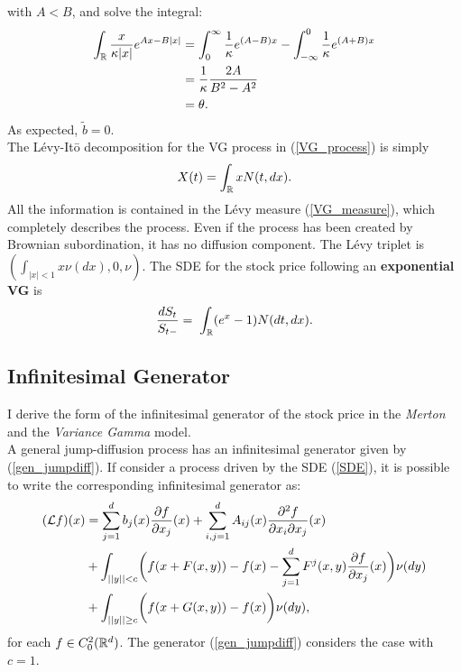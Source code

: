 with $A<B$, and solve the integral:
\begin{align*}
 \int_{\mathbb{R}} \frac{x}{\kappa |x|} e^{Ax-B|x|} &= \int_{0}^{\infty} \frac{1}{\kappa} e^{(A-B)x} 
 - \int_{-\infty}^0 \frac{1}{\kappa} e^{(A+B)x} \\
 &= \frac{1}{\kappa} \frac{2A}{B^2-A^2} \\
 &= \theta.
\end{align*}
As expected, $\tilde b = 0$. \\
The Lévy-It\={o} decomposition for the VG process in (\ref{VG_process}) is simply
\begin{equation}
X(t) = \int_{\mathbb{R}} x N(t,dx). 
\end{equation}
All the information is contained in the Lévy measure (\ref{VG_measure}),
which completely describes the process. Even if the process has been created by Brownian
subordination, it has no diffusion component.  
The L\'evy triplet is $( \int_{|x|<1} x \nu(dx), 0, \nu)$.
The SDE for the stock price following an \textbf{exponential VG} is 
\begin{equation}\label{VG_sde}
 \frac{d S_t}{S_{t-}}  = \; \int_{\mathbb{R}} (e^{x} - 1) N(dt,dx).  
\end{equation}


\subsection{Infinitesimal Generator}

I derive the form of the infinitesimal generator of the stock price in the \emph{Merton} and the \emph{Variance Gamma} model.\\
A general jump-diffusion process has an infinitesimal generator given by (\ref{gen_jumpdiff}). If consider a process driven
by the SDE (\ref{SDE}), it is possible to write the corresponding infinitesimal generator as:
\begin{align} \label{gen_sde}
  (\mathcal{L} f)(x) &= \sum_{j=1}^{d} b_j(x) \frac{\partial f}{\partial x_j}(x) +
  \sum_{i,j=1}^{d} A_{ij}(x) \frac{\partial^2 f}{\partial x_i \partial x_j}(x)\\  
           & + \int_{||y||< c} \biggl( f(x+F(x,y)) - f(x) - \sum_{j=1}^{d} F^j(x,y) \frac{\partial f}{\partial x_j}(x) 
            \biggr) \nu(dy) \\  \nonumber
            & + \int_{||y||\geq c} \biggl( f(x+G(x,y)) - f(x) \biggr) \nu(dy),   \nonumber
\end{align} 
for each $f \in C^2_0(\mathbb{R}^d)$. The generator (\ref{gen_jumpdiff}) considers the case with $c=1$.\\

